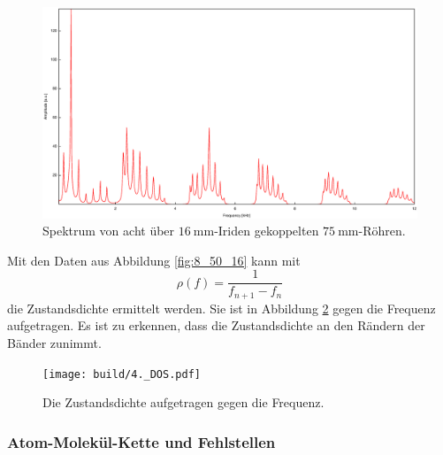 \begin{figure}
\centering
\includegraphics[width=\linewidth-60pt,height=\textheight-60pt,keepaspectratio]{FP-V23data/4.5_600mm_16mm.eps}
\caption{Spektrum von acht über $\SI{16}{\milli\meter}$-Iriden gekoppelten $\SI{75}{\milli\meter}$-Röhren.}
\label{fig:8_75_16}
\end{figure}

\newpage
\noindent Mit den Daten aus Abbildung \ref{fig:8_50_16} kann mit
\[
\rho(f) = \frac{1}{f_{n+1}-f_n}
\]
die Zustandsdichte ermittelt werden. Sie ist in Abbildung \ref{fig:DOS} gegen die Frequenz aufgetragen. Es ist zu erkennen, dass die Zustandsdichte an den Rändern der Bänder zunimmt.

\begin{figure}
\centering
\texttt{[image: build/4.\_DOS.pdf]}
\caption{Die Zustandsdichte aufgetragen gegen die Frequenz.}
\label{fig:DOS}
\end{figure}

\subsubsection{Atom-Molekül-Kette und Fehlstellen}

